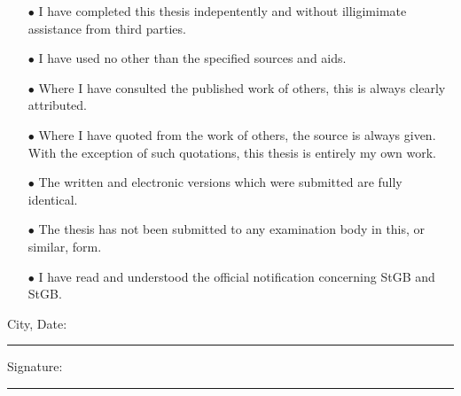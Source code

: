 \begin{itemize}
\item[$\bullet$] I have completed this thesis indepentently and without illigimimate assistance from third parties.
\item[$\bullet$] I have used no other than the specified sources and aids.
\item[$\bullet$] Where I have consulted the published work of others, this is always clearly attributed.
\item[$\bullet$] Where I have quoted from the work of others, the source is always given. With the exception of such quotations, this thesis is entirely my own work.
\item[$\bullet$] The written and electronic versions which were submitted are fully identical.
\item[$\bullet$] The thesis has not been submitted to any examination body in this, or similar, form.
\item[$\bullet$] I have read and understood the official notification concerning  StGB and  StGB.\\
\end{itemize}
 \vspace{1cm}
\noindent City, Date:\\
\rule[0.5em]{25em}{0.5pt} %
\vfill
\noindent Signature:\\
\rule[0.5em]{25em}{0.5pt} %

\vfill
\cleardoublepage

\tableofcontents